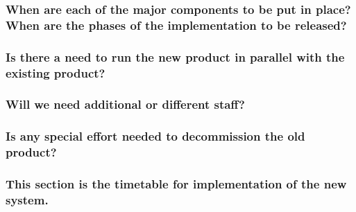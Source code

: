 \documentclass[
]{article}
\begin{document}
\hypertarget{when-are-each-of-the-major-components-to-be-put-in-place-when-are-the-phases-of-the-implementation-to-be-released}{%
\subsubsection{\texorpdfstring{When are each of the major components to
be put in place? When are the phases of the implementation to be
released?
}{When are each of the major components to be put in place? When are the phases of the implementation to be released? }}\label{when-are-each-of-the-major-components-to-be-put-in-place-when-are-the-phases-of-the-implementation-to-be-released}}

\hypertarget{is-there-a-need-to-run-the-new-product-in-parallel-with-the-existing-product}{%
\subsubsection{Is there a need to run the new product in parallel with
the existing
product?}\label{is-there-a-need-to-run-the-new-product-in-parallel-with-the-existing-product}}

\hypertarget{will-we-need-additional-or-different-staff}{%
\subsubsection{Will we need additional or different
staff?}\label{will-we-need-additional-or-different-staff}}

\hypertarget{is-any-special-effort-needed-to-decommission-the-old-product}{%
\subsubsection{\texorpdfstring{Is any special effort needed to
decommission the old product?
}{Is any special effort needed to decommission the old product? }}\label{is-any-special-effort-needed-to-decommission-the-old-product}}

\hypertarget{this-section-is-the-timetable-for-implementation-of-the-new-system.}{%
\subsubsection{\texorpdfstring{This section is the timetable for
implementation of the new system.
}{This section is the timetable for implementation of the new system. }}\label{this-section-is-the-timetable-for-implementation-of-the-new-system.}}
\end{document}
